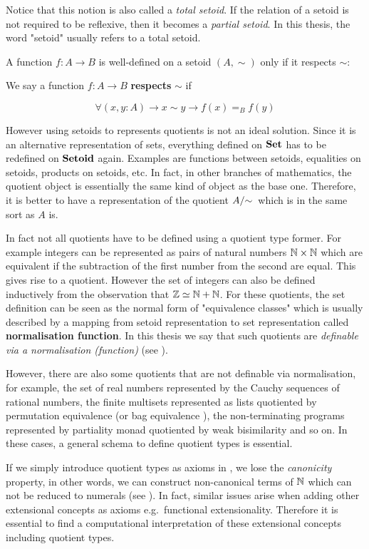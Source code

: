 Notice that this notion is also called a \emph{total setoid}. If the relation of a setoid is not required to be reflexive, then it becomes a \emph{partial setoid}. In this thesis, the word "setoid" usually refers to a total setoid.


A function $f : A \to B$ is well-defined on a setoid $(A,\sim)$ only if it respects $\sim$:

\begin{definition}\label{compatible}
We say a function $f : A \to B$ \textbf{respects} $\sim$ if

$$\forall (x, y : A) \to x \sim y \to f(x) =_{B} f(y)$$
\end{definition}

However using setoids to represents quotients is not an ideal solution. Since it is an alternative representation of sets, everything defined on $\operatorname{\mathbf{Set}}$ has to be redefined on $\operatorname{\mathbf{Setoid}}$ again. 
Examples are functions between setoids, equalities on setoids,
products on setoids, etc.
In fact, in other branches of mathematics, the quotient object is essentially the same kind of object as the base one.
Therefore, it is better to have a representation of the quotient $\qset{A}$ which is in the same sort as $A$ is. 

In fact not all quotients have to be defined using a quotient type former. For example integers can be represented as pairs of natural numbers $\mathbb{N} \times \mathbb{N}$ which are equivalent if the subtraction of the first number from the second are equal. This gives rise to a quotient. However the set of integers can also be defined inductively from the observation that $\mathbb{Z} \simeq \mathbb{N} + \mathbb{N}$.
For these quotients, the set definition can be seen as the normal form of "equivalence classes" which is usually described by a mapping from setoid representation to set representation called \textbf{normalisation function}. In this thesis we say that such quotients are \emph{definable via a normalisation (function)} (see ).


However, there are also some quotients that are not definable via normalisation, for example, the set of real numbers represented by the Cauchy sequences of rational numbers, the finite multisets represented as lists quotiented by permutation equivalence (or bag equivalence \cite{DBLP:conf/itp/Danielsson12}), the non-terminating programs represented by partiality monad quotiented by weak bisimilarity and so on. In these cases, a general schema to define quotient types is essential.

If we simply introduce quotient types as axioms in \itt, we lose the \emph{canonicity} property, in other words, we can construct non-canonical terms of $\mathbb{N}$ which can not be reduced to numerals (see ). In fact, similar issues arise when adding other extensional concepts as axioms e.g.\ functional extensionality. Therefore it is essential to find a computational interpretation of these extensional concepts including quotient types.

